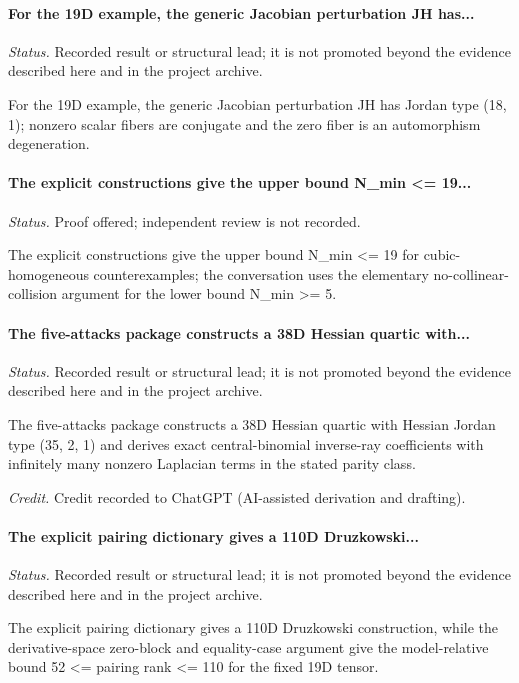\label{supp-note-05-007}
\paragraph{For the 19D example, the generic Jacobian perturbation JH has...}
\emph{Status.} Recorded result or structural lead; it is not promoted beyond the evidence described here and in the project archive.

For the 19D example, the generic Jacobian perturbation JH has Jordan type (18, 1); nonzero scalar fibers are conjugate and the zero fiber is an automorphism degeneration.

\label{supp-note-05-008}
\paragraph{The explicit constructions give the upper bound N\_min <= 19...}
\emph{Status.} Proof offered; independent review is not recorded.

The explicit constructions give the upper bound N\_min <= 19 for cubic-homogeneous counterexamples; the conversation uses the elementary no-collinear-collision argument for the lower bound N\_min >= 5.

\label{supp-note-05-009}
\paragraph{The five-attacks package constructs a 38D Hessian quartic with...}
\emph{Status.} Recorded result or structural lead; it is not promoted beyond the evidence described here and in the project archive.

The five-attacks package constructs a 38D Hessian quartic with Hessian Jordan type (35, 2, 1) and derives exact central-binomial inverse-ray coefficients with infinitely many nonzero Laplacian terms in the stated parity class.

\emph{Credit.} Credit recorded to ChatGPT (AI-assisted derivation and drafting).

\label{supp-note-05-010}
\paragraph{The explicit pairing dictionary gives a 110D Druzkowski...}
\emph{Status.} Recorded result or structural lead; it is not promoted beyond the evidence described here and in the project archive.

The explicit pairing dictionary gives a 110D Druzkowski construction, while the derivative-space zero-block and equality-case argument give the model-relative bound 52 <= pairing rank <= 110 for the fixed 19D tensor.

